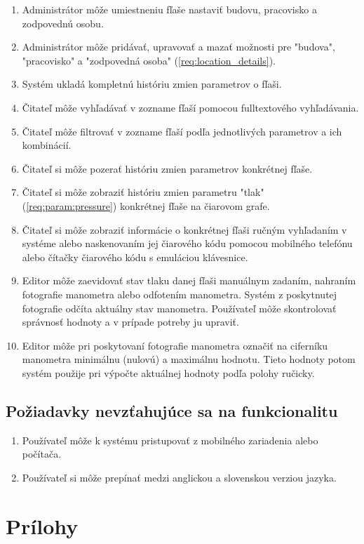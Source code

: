 \documentclass[hreffootnote]{zah}
\begin{document}
\begin{enumerate}
\item \label{req:location_details} Administrátor môže umiestneniu fľaše nastaviť budovu, pracovisko a zodpovednú osobu.
\item Administrátor môže pridávať, upravovať a mazať možnosti pre "budova", "pracovisko" a "zodpovedná osoba" (\ref{req:location_details}).
\item \label{req:history} Systém ukladá kompletnú históriu zmien parametrov o fľaši.
\item Čitateľ môže vyhľadávať v zozname fľaší pomocou fulltextového vyhľadávania.
\item Čitateľ môže filtrovať v zozname fľaší podľa jednotlivých parametrov a ich kombinácií.
\item Čitateľ si môže pozerať históriu zmien parametrov konkrétnej fľaše.
\item Čitateľ si môže zobraziť históriu zmien parametru "tlak" (\ref{req:param:pressure}) konkrétnej fľaše na čiarovom grafe.
\item Čitateľ si môže zobraziť informácie o konkrétnej fľaši ručným vyhľadaním v systéme alebo naskenovaním jej čiarového kódu pomocou mobilného telefónu alebo čítačky čiarového kódu s emuláciou klávesnice.
\item Editor môže zaevidovať stav tlaku danej fľaši manuálnym zadaním, nahraním fotografie manometra alebo odfotením manometra.
Systém z poskytnutej fotografie odčíta aktuálny stav manometra. Používateľ môže skontrolovať správnosť hodnoty a v prípade potreby ju upraviť.
\item Editor môže pri poskytovaní fotografie manometra označiť na ciferníku manometra minimálnu (nulovú) a maximálnu hodnotu. Tieto hodnoty potom systém použije pri výpočte aktuálnej hodnoty podľa polohy ručicky.
\end{enumerate}

\subsection{Požiadavky nevzťahujúce sa na funkcionalitu}

\begin{enumerate}
\item Používateľ môže k systému pristupovať z mobilného zariadenia alebo počítača.
\item Používateľ si môže prepínať medzi anglickou a slovenskou verziou jazyka.
\end{enumerate}


\cleardoublepage
\section{Prílohy}
\end{document}
